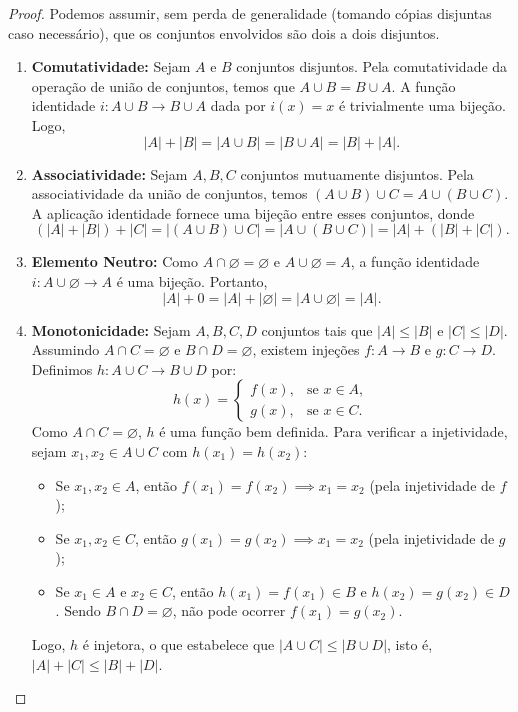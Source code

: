 \begin{proof}
    Podemos assumir, sem perda de generalidade (tomando cópias disjuntas caso necessário), que os conjuntos envolvidos são dois a dois disjuntos.
    \begin{enumerate}
        \item \textbf{Comutatividade:} Sejam \(A\) e \(B\) conjuntos disjuntos. Pela comutatividade da operação de união de conjuntos, temos que \(A \cup B = B \cup A\). A função identidade \(i: A \cup B \to B \cup A\) dada por \(i(x) = x\) é trivialmente uma bijeção. Logo,
              \[
                  |A| + |B| = |A \cup B| = |B \cup A| = |B| + |A|.
              \]

        \item \textbf{Associatividade:} Sejam \(A, B, C\) conjuntos mutuamente disjuntos. Pela associatividade da união de conjuntos, temos \((A \cup B) \cup C = A \cup (B \cup C)\). A aplicação identidade fornece uma bijeção entre esses conjuntos, donde
              \[
                  (|A| + |B|) + |C| = |(A \cup B) \cup C| = |A \cup (B \cup C)| = |A| + (|B| + |C|).
              \]

        \item \textbf{Elemento Neutro:} Como \(A \cap \varnothing = \varnothing\) e \(A \cup \varnothing = A\), a função identidade \(i: A \cup \varnothing \to A\) é uma bijeção. Portanto,
              \[
                  |A| + 0 = |A| + |\varnothing| = |A \cup \varnothing| = |A|.
              \]

        \item \textbf{Monotonicidade:} Sejam \(A, B, C, D\) conjuntos tais que \(|A| \leq |B|\) e \(|C| \leq |D|\). Assumindo \(A \cap C = \varnothing\) e \(B \cap D = \varnothing\), existem injeções \(f: A \to B\) e \(g: C \to D\). Definimos \(h: A \cup C \to B \cup D\) por:
              \[
                  h(x) =
                  \begin{cases}
                      f(x), & \text{se } x \in A, \\
                      g(x), & \text{se } x \in C.
                  \end{cases}
              \]
              Como \(A \cap C = \varnothing\), \(h\) é uma função bem definida. Para verificar a injetividade, sejam \(x_1, x_2 \in A \cup C\) com \(h(x_1) = h(x_2)\):
              \begin{itemize}
                  \item Se \(x_1, x_2 \in A\), então \(f(x_1) = f(x_2) \implies x_1 = x_2\) (pela injetividade de \(f\));
                  \item Se \(x_1, x_2 \in C\), então \(g(x_1) = g(x_2) \implies x_1 = x_2\) (pela injetividade de \(g\));
                  \item Se \(x_1 \in A\) e \(x_2 \in C\), então \(h(x_1) = f(x_1) \in B\) e \(h(x_2) = g(x_2) \in D\). Sendo \(B \cap D = \varnothing\), não pode ocorrer \(f(x_1) = g(x_2)\).
              \end{itemize}
              Logo, \(h\) é injetora, o que estabelece que \(|A \cup C| \leq |B \cup D|\), isto é, \(|A| + |C| \leq |B| + |D|\).
    \end{enumerate}
\end{proof}

